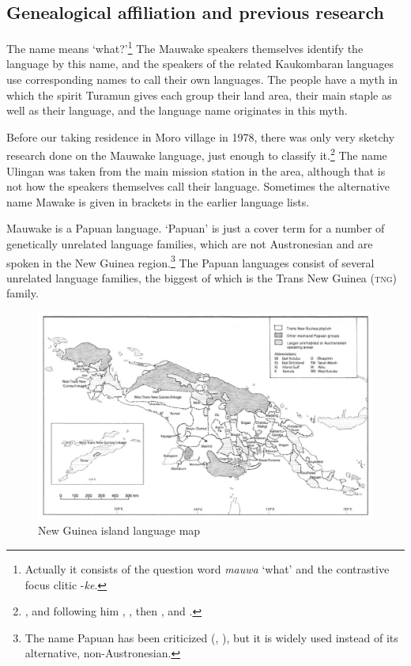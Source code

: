 \subsection{Genealogical affiliation and previous research}\label{sec:1.4.1}
The name  means `what?'\footnote{Actually it consists of the question word \textit{mauwa} `what' and the contrastive focus clitic -\textit{ke}.}  The Mauwake speakers themselves identify the language by this name, and the speakers of the related Kaukombaran languages use corresponding names to call their own languages.  The people have a myth in which the spirit Turamun gives each group their land area, their main staple as well as their language, and the language name originates in this myth.

Before our taking residence in Moro village in 1978, there was only very sketchy research done on the Mauwake language, just enough to classify it.\footnote{\citet{Capell1952}, and following him \citet{VoegelinEtAl1965}, \citet{Greenberg1971}, then \citet{ZGraggen1971,ZGraggen1975a}, \citet{Wurm1975,Wurm1982} and \citet{Hattori1981}.} The name Ulingan was taken from the main mission station in the area, although that is not how the speakers themselves call their language. Sometimes the alternative name Mawake is given in brackets in the earlier language lists.  

Mauwake is a Papuan language. `Papuan' is just a cover term for a number of genetically unrelated language families, which are not Austronesian and are spoken in the New Guinea region.\footnote{The name Papuan has been criticized (\citealt{Capell1969}, \citealt{Haiman1979}), but it is widely used instead of its alternative, non-Austronesian.} The Papuan languages consist of several unrelated language families, the biggest of which is the Trans New Guinea (\textsc{tng}) family.  


\begin{figure}
\caption{New Guinea island language map \citep[34 Map~2]{Ross2005}}
\label{map:2:NewGuineamap}
\includegraphics[width=\textwidth]{figures/1-new_guinea_island_language_map.jpeg}
\end{figure}

